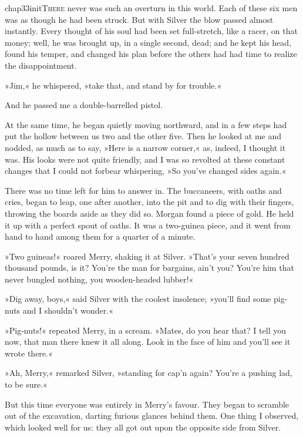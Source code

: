 
   \lettrine[lines=4,image=true]{chap33initT}{here} never was such an overturn in this world. Each of these six men was as though he had been struck. But with Silver the blow passed almost instantly. Every thought of his soul had been set full-stretch, like a racer, on that money; well, he was brought up, in a single second, dead; and he kept his head, found his temper, and changed his plan before the others had had time to realize the disappointment.

»Jim,« he whispered, »take that, and stand by for trouble.«

And he passed me a double-barrelled pistol.

At the same time, he began quietly moving northward, and in a few steps had put the hollow between us two and the other five. Then he looked at me and nodded, as much as to say, »Here is a narrow corner,« as, indeed, I thought it was. His looks were not quite friendly, and I was so revolted at these constant changes that I could not forbear whispering, »So you've changed sides again.«

There was no time left for him to answer in. The buccaneers, with oaths and cries, began to leap, one after another, into the pit and to dig with their fingers, throwing the boards aside as they did so. Morgan found a piece of gold. He held it up with a perfect spout of oaths. It was a two-guinea piece, and it went from hand to hand among them for a quarter of a minute.

»Two guineas!« roared Merry, shaking it at Silver. »That's your seven hundred thousand pounds, is it? You're the man for bargains, ain't you? You're him that never bungled nothing, you wooden-headed lubber!«

»Dig away, boys,« said Silver with the coolest insolence; »you'll find some pig-nuts and I shouldn't wonder.«

»Pig-nuts!« repeated Merry, in a scream. »Mates, do you hear that? I tell you now, that man there knew it all along. Look in the face of him and you'll see it wrote there.«

»Ah, Merry,« remarked Silver, »standing for cap'n again? You're a pushing lad, to be sure.«

But this time everyone was entirely in Merry's favour. They began to scramble out of the excavation, darting furious glances behind them. One thing I observed, which looked well for us: they all got out upon the opposite side from Silver.

